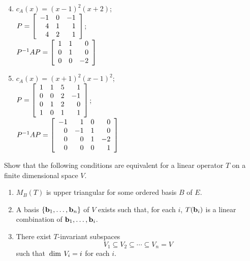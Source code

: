 \begin{multicols}{2}
\begin{ex}
\begin{sol}
\begin{enumerate}[label={\alph*.}]
\setcounter{enumi}{3}
\item $c_A(x) = (x - 1)^2(x + 2)$; \\ $P = \left[ \begin{array}{rrr}
-1 & 0 & -1 \\
4 & 1 & 1 \\
4 & 2 & 1
\end{array} \right]$; \\ $P^{-1}AP = \left[ \begin{array}{rrr}
1 & 1 & 0 \\
0 & 1 & 0 \\
0 & 0 & -2
\end{array} \right]$

\setcounter{enumi}{5}
\item $c_A(x) = (x + 1)^2(x - 1)^2$; \\ $P = \left[ \begin{array}{rrrr}
1 & 1 & 5 & 1 \\
0 & 0 & 2 & -1 \\
0 & 1 & 2 & 0 \\
1 & 0 & 1 & 1
\end{array} \right]$; \\ $P^{-1}AP = \left[ \begin{array}{rrrr}
-1 & 1 & 0 & 0 \\
0 & -1 & 1 & 0 \\
0 & 0 & 1 & -2 \\
0 & 0 & 0 & 1
\end{array} \right]$

\end{enumerate}
\end{sol}
\end{ex}

\begin{ex}
Show that the following conditions are equivalent for a linear operator $T$ on a finite dimensional space $V$.


\begin{enumerate}
\item $M_{B}(T)$ is upper triangular for some ordered basis $B$ of $E$.

\item A basis $\{\textbf{b}_{1}, \dots, \textbf{b}_{n}\}$ of $V$ exists such that, for each $i$, $T(\textbf{b}_{i})$ is a linear combination of $\textbf{b}_{1}, \dots, \textbf{b}_{i}$.

\item There exist $T$-invariant subspaces 
\begin{equation*}
V_1 \subseteq V_2 \subseteq \cdots \subseteq V_n = V
\end{equation*}
such that $\thinspace\operatorname{dim \medspace}V_{i} = i$ for each $i$.


\end{enumerate}
\end{ex}
\end{multicols}
